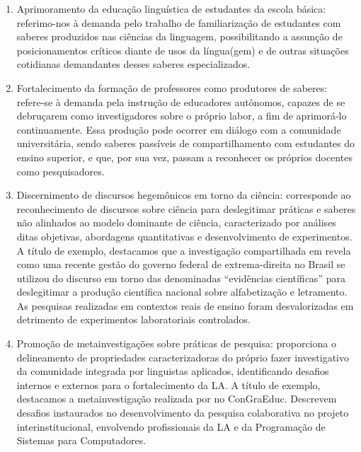 \begin{enumerate}
	\item Aprimoramento da educação linguística de estudantes da escola básica: referimo-nos à demanda pelo trabalho de familiarização de estudantes com saberes produzidos nas ciências da linguagem, possibilitando a assunção de posicionamentos críticos diante de usos da língua(gem) e de outras situações cotidianas demandantes desses saberes especializados.

	\item Fortalecimento da formação de professores como produtores de saberes: refere-se à demanda pela instrução de educadores autônomos, capazes de se debruçarem como investigadores sobre o próprio labor, a fim de aprimorá-lo continuamente. Essa produção pode ocorrer em diálogo com a comunidade universitária, sendo saberes passíveis de compartilhamento com estudantes do ensino superior, e que, por sua vez, passam a reconhecer os próprios docentes como pesquisadores.

	\item Discernimento de discursos hegemônicos em torno da ciência: corresponde ao reconhecimento de discursos sobre ciência para deslegitimar práticas e saberes não alinhados ao modelo dominante de ciência, caracterizado por análises ditas objetivas, abordagens quantitativas e desenvolvimento de experimentos. A título de exemplo, destacamos que a investigação compartilhada em \textcite{silva_educacao_2020b, silva_letramento_2021} revela como uma recente gestão do governo federal de extrema-direita no Brasil se utilizou do discurso em torno das denominadas ``evidências científicas'' para deslegitimar a produção científica nacional sobre alfabetização e letramento. As pesquisas realizadas em contextos reais de ensino foram desvalorizadas em detrimento de experimentos laboratoriais controlados.
		
	\item Promoção de metainvestigações sobre práticas de pesquisa: proporciona o delineamento de propriedades caracterizadoras do próprio fazer investigativo da comunidade integrada por linguistas aplicados, identificando desafios internos e externos para o fortalecimento da LA. A título de exemplo, destacamos a metainvestigação realizada por \textcite{silva_desafios_2023} no ConGraEduc. Descrevem desafios instaurados no desenvolvimento da pesquisa colaborativa no projeto interinstitucional, envolvendo profissionais da LA e da Programação de Sistemas para Computadores.
\end{enumerate}


